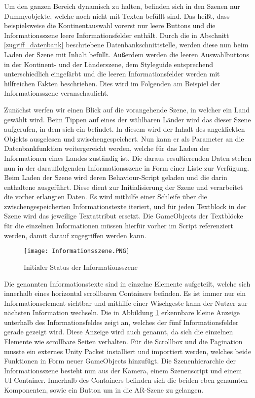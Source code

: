 Um den ganzen Bereich dynamisch zu halten, befinden sich in den Szenen nur Dummyobjekte, welche noch nicht mit Texten befüllt sind. Das heißt, dass beispielsweise die Kontinentauswahl vorerst nur leere Buttons und die Informationsszene leere Informationsfelder enthält.
Durch die in Abschnitt \ref{zugriff_datenbank} beschriebene Datenbankschnittstelle, werden diese nun beim Laden der Szene mit Inhalt befüllt. 
Außerdem werden die leeren Auswahlbuttons in der Kontinent- und der Länderszene, dem Styleguide entsprechend unterschiedlich eingefärbt und die leeren Informationsfelder werden mit hilfreichen Fakten beschrieben.
Dies wird im Folgenden am Beispiel der Informationsszene veranschaulicht.

Zunächst werfen wir einen Blick auf die vorangehende Szene, in welcher ein Land gewählt wird. 
Beim Tippen auf eines der wählbaren Länder wird das  dieser Szene aufgerufen, in dem sich ein  befindet. 
In diesem wird der Inhalt des angeklickten Objekts ausgelesen und zwischengespeichert. Nun kann er als Parameter an die Datenbankfunktion weitergereicht werden, welche für das Laden der Informationen eines Landes zuständig ist. 
Die daraus resultierenden Daten stehen nun in der darauffolgenden Informationsszene in Form einer Liste zur Verfügung.
Beim Laden der Szene wird deren Behaviour-Script geladen und die darin enthaltene  ausgeführt. Diese dient zur Initialisierung der Szene und verarbeitet die vorher erlangten Daten.
Es wird mithilfe einer Schleife über die zwischengespeicherten Informationstexte iteriert, und für jeden Textblock in der Szene wird das jeweilige Textattribut ersetzt.
Die GameObjects der Textblöcke für die einzelnen Informationen müssen hierfür vorher im Script referenziert werden, damit darauf zugegriffen werden kann.

\begin{figure} [h]
\centering
\texttt{[image: Informationsszene.PNG]}
\caption{Initialer Status der Informationsszene}
\label{fig:infoscene}
\end{figure}
Die genannten Informationstexte sind in einzelne Elemente aufgeteilt, welche sich innerhalb eines horizontal scrollbaren Containers befinden. 
Es ist immer nur ein Informationselement sichtbar und mithilfe einer Wischgeste kann der Nutzer zur nächsten Information wechseln.
Die in Abbildung \ref{fig:infoscene} erkennbare kleine Anzeige unterhalb des Informationsfeldes zeigt an, welches der fünf Informationsfelder gerade gezeigt wird.
Diese Anzeige wird auch  genannt, da sich die einzelnen Elemente wie scrollbare Seiten verhalten.
Für die Scrollbox und die Pagination musste ein externes Unity Packet installiert und importiert werden, welches beide Funktionen in Form neuer GameObjects hinzufügt.
Die Szenenhierarchie der Informationsszene besteht nun aus der Kamera, einem Szenenscript und einem UI-Container. 
Innerhalb des Containers befinden sich die beiden eben genannten Komponenten, sowie ein Button um in die AR-Szene zu gelangen.

